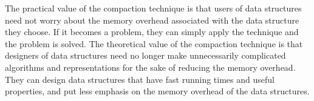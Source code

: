 \documentclass{DIKU-article}
\begin{document}
The practical value of the compaction technique is that users of data
structures need not worry about the memory overhead associated with
the data structure they choose.  If it becomes a problem, they can
simply apply the technique and the problem is solved.  The theoretical
value of the compaction technique is that designers of data structures
need no longer make unnecessarily complicated algorithms and
representations for the sake of reducing the memory overhead.  They
can design data structures that have
fast running times and useful properties, and put less emphasis on the
memory overhead of the data structures.




\end{document}
